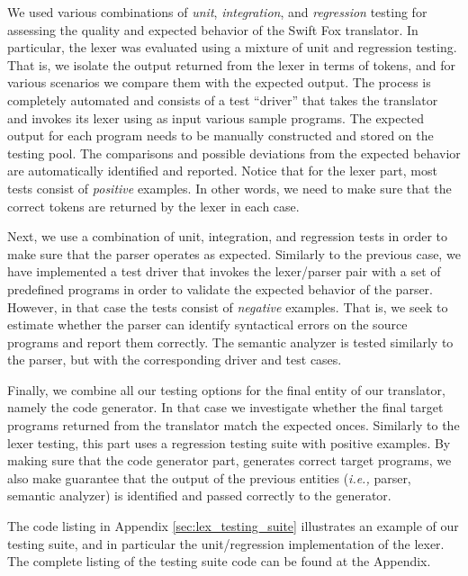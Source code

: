 We used various combinations of \textit{unit}, \textit{integration}, and
\textit{regression} testing for assessing the quality and expected behavior
of the Swift Fox translator. In particular, the lexer was evaluated using a
mixture of unit and regression testing. That is, we isolate the output
returned from the lexer in terms of tokens, and for various scenarios we
compare them with the expected output. The process is completely automated 
and consists of a test ``driver'' that takes the translator and invokes its
lexer using as input various sample programs. The expected output for each 
program needs to be manually constructed and stored on the testing pool.
The comparisons and possible deviations from the expected behavior are
automatically identified and reported. Notice that for the lexer part, most
tests consist of \textit{positive} examples. In other words, we need to
make sure that the correct tokens are returned by the lexer in each case.

Next, we use a combination of unit, integration, and regression tests in
order to make sure that the parser operates as expected. Similarly to the
previous case, we have implemented a test driver that invokes the
lexer/parser pair with a set of predefined programs in order to validate
the expected behavior of the parser. However, in that case the tests
consist of \textit{negative} examples. That is, we seek to estimate whether
the parser can identify syntactical errors on the source programs and
report them correctly. The semantic analyzer is tested similarly to the
parser, but with the corresponding driver and test cases.

Finally, we combine all our testing options for the final entity of our
translator, namely the code generator. In that case we investigate whether
the final target programs returned from the translator match the expected
onces. Similarly to the lexer testing, this part uses a regression testing
suite with positive examples. By making sure that the code generator part,
generates correct target programs, we also make guarantee that the output
of the previous entities (\textit{i.e.,} parser, semantic analyzer) is
identified and passed correctly to the generator.

The code listing in Appendix \ref{sec:lex_testing_suite} illustrates an
example of our testing suite, and in particular the unit/regression
implementation of the lexer. The complete listing of the testing suite code
can be found at the Appendix. 
